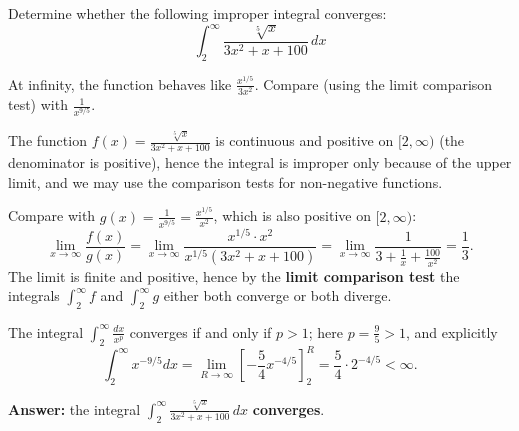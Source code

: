 
\begin{question}
Determine whether the following improper integral converges:
\[ \int_2^\infty \frac{\sqrt[5]{x}}{3x^2+x+100}\,dx \]
\end{question}

\begin{hint}
At infinity, the function behaves like $\frac{x^{1/5}}{3x^2}$. Compare (using the limit comparison test) with $\frac{1}{x^{9/5}}$.
\end{hint}

\begin{solution}
The function $f(x)=\frac{\sqrt[5]{x}}{3x^2+x+100}$ is continuous and positive on $[2,\infty)$ (the denominator is positive), hence the integral is improper only because of the upper limit, and we may use the comparison tests for non-negative functions.

Compare with $g(x)=\frac{1}{x^{9/5}}=\frac{x^{1/5}}{x^2}$, which is also positive on $[2,\infty)$:
\[ \lim_{x\to\infty}\frac{f(x)}{g(x)}=\lim_{x\to\infty}\frac{x^{1/5}\cdot x^{2}}{x^{1/5}(3x^2+x+100)}=\lim_{x\to\infty}\frac{1}{3+\frac1x+\frac{100}{x^2}}=\frac13. \]
The limit is finite and positive, hence by the \textbf{limit comparison test} the integrals $\int_2^\infty f$ and $\int_2^\infty g$ either both converge or both diverge.

The integral $\int_2^\infty\frac{dx}{x^p}$ converges if and only if $p>1$; here $p=\frac95>1$, and explicitly
\[ \int_2^\infty x^{-9/5}dx=\lim_{R\to\infty}\left[-\frac54x^{-4/5}\right]_2^R=\frac54\cdot2^{-4/5}<\infty. \]

\textbf{Answer:} the integral $\int_2^\infty\frac{\sqrt[5]{x}}{3x^2+x+100}\,dx$ \textbf{converges}.
\end{solution}
